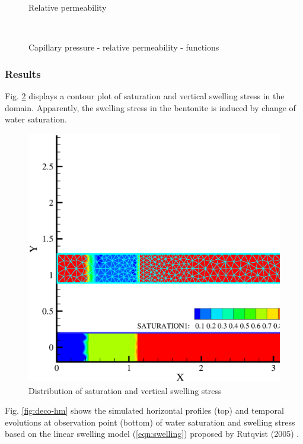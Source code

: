\begin{figure}[!htb]
\begin{center}
\begin{minipage}[t]{0.45\textwidth}
\begin{center}
        \centerline{Relative permeability}
      \end{center}
    \end{minipage}\\
  \end{center}
  \caption{Capillary pressure - relative permeability - functions}
  \label{fig:cp_cp}
\end{figure}


\subsubsection*{Results}

Fig. \ref{fig:hmswl_cont} displays a contour plot of saturation and vertical swelling stress in the domain. Apparently, the swelling stress in the bentonite is induced by change of water saturation.
\begin{figure}[!htb]
\centering
\includegraphics[scale=0.5]{HM/HM_unsat/swelling_cont.eps}
\caption{Distribution of saturation and vertical swelling stress}
\label{fig:hmswl_cont}
\end{figure}

Fig. \ref{fig:deco-hm} shows the simulated horizontal profiles (top) and temporal evolutions at observation point (bottom) of water saturation and swelling stress based on the linear swelling model (\ref{eqn:swelling}) proposed by Rutqvist (2005) \cite{Jonny05}.

